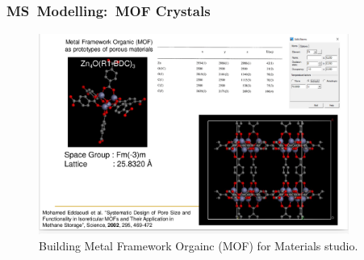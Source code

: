 \frame
{
	\frametitle{\textrm{MS~Modelling:~MOF Crystals}}
\begin{figure}[h!]
\centering
\vspace*{-0.18in}
\includegraphics[height=2.60in,width=4.00in,viewport=0 0 1148 740,clip]{Figures/MS-Building_MOF.png}
\caption{\tiny \textrm{Building Metal Framework Orgainc (MOF) for Materials studio.}}%
\label{MS-Building_MOF}
\end{figure}
}

